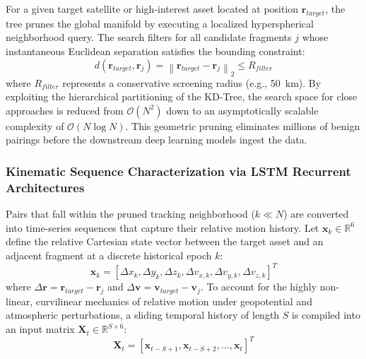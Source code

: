 \documentclass[letterpaper, preprint, 11pt]{AAS}
\begin{document}
For a given target satellite or high-interest asset located at position $\mathbf{r}_{target}$, the tree prunes the global manifold by executing a localized hyperspherical neighborhood query. The search filters for all candidate fragments $j$ whose instantaneous Euclidean separation satisfies the bounding constraint:
\begin{equation}
    d(\mathbf{r}_{target}, \mathbf{r}_j) = \left\| \mathbf{r}_{target} - \mathbf{r}_j \right\|_2 \le R_{filter}
    \label{eq:kdtree_distance}
\end{equation}
where $R_{filter}$ represents a conservative screening radius (e.g., 50~km). By exploiting the hierarchical partitioning of the KD-Tree, the search space for close approaches is reduced from $\mathcal{O}(N^2)$ down to an asymptotically scalable complexity of $\mathcal{O}(N \log N)$. This geometric pruning eliminates millions of benign pairings before the downstream deep learning models ingest the data.

\subsubsection{Kinematic Sequence Characterization via LSTM Recurrent Architectures}
Pairs that fall within the pruned tracking neighborhood ($k \ll N$) are converted into time-series sequences that capture their relative motion history. Let $\mathbf{x}_k \in \mathbb{R}^6$ define the relative Cartesian state vector between the target asset and an adjacent fragment at a discrete historical epoch $k$:
\begin{equation}
    \mathbf{x}_k = \left[ \Delta x_k, \Delta y_k, \Delta z_k, \Delta v_{x,k}, \Delta v_{y,k}, \Delta v_{z,k} \right]^T
    \label{eq:relative_state_vector}
\end{equation}
where $\Delta \mathbf{r} = \mathbf{r}_{target} - \mathbf{r}_j$ and $\Delta \mathbf{v} = \mathbf{v}_{target} - \mathbf{v}_j$. To account for the highly non-linear, curvilinear mechanics of relative motion under geopotential and atmospheric perturbations, a sliding temporal history of length $S$ is compiled into an input matrix $\mathbf{X}_t \in \mathbb{R}^{S \times 6}$:
\begin{equation}
    \mathbf{X}_t = \left[ \mathbf{x}_{t-S+1}, \mathbf{x}_{t-S+2}, \dots, \mathbf{x}_t \right]^T
    \label{eq:sequence_matrix}
\end{equation}
\end{document}
